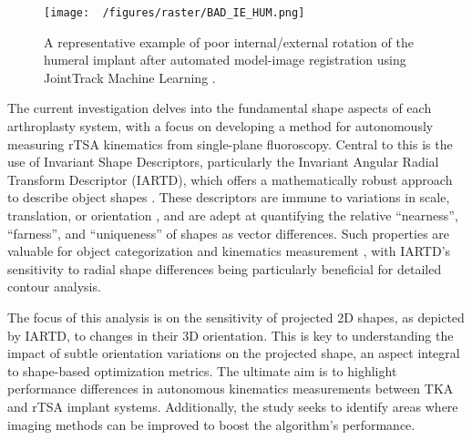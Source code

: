 \begin{figure}[h!]
	\centering
	\texttt{[image: ~/figures/raster/BAD\_IE\_HUM.png]}
	\caption{A representative example of poor internal/external rotation of the humeral implant after automated model-image registration using JointTrack Machine Learning \cite{jensenJointTrackMachine2023}.}
	\label{fig:bad_ie_hum}
\end{figure}

The current investigation delves into the fundamental shape aspects of each arthroplasty system, with a focus on developing a method for autonomously measuring rTSA kinematics from single-plane fluoroscopy.
Central to this is the use of Invariant Shape Descriptors, particularly the Invariant Angular Radial Transform Descriptor (IARTD), which offers a mathematically robust approach to describe object shapes \cite{leeNewShapeDescription2012}.
These descriptors are immune to variations in scale, translation, or orientation \cite{zhangReviewShapeRepresentation2004}, and are adept at quantifying the relative ``nearness'', ``farness'', and ``uniqueness'' of shapes as vector differences.
Such properties are valuable for object categorization \cite{richardIdentificationThreeDimensionalObjects1974,wallaceAnalysisThreedimensionalMovement1980,wallaceEfficientThreedimensionalAircraft1980} and kinematics measurement \cite{banksAccurateMeasurementThreedimensional1996}, with IARTD's sensitivity to radial shape differences \cite{leeNewShapeDescription2012} being particularly beneficial for detailed contour analysis.

The focus of this analysis is on the sensitivity of projected 2D shapes, as depicted by IARTD, to changes in their 3D orientation.
This is key to understanding the impact of subtle orientation variations on the projected shape, an aspect integral to shape-based optimization metrics.
The ultimate aim is to highlight performance differences in autonomous kinematics measurements between TKA and rTSA implant systems.
Additionally, the study seeks to identify areas where imaging methods can be improved to boost the algorithm's performance.

